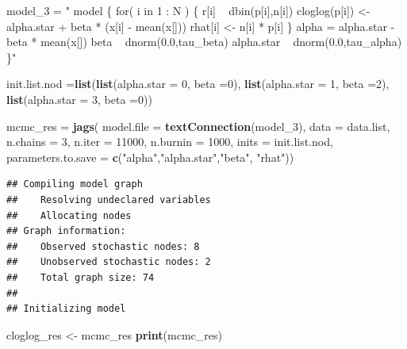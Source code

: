\documentclass[]{article}
\newenvironment{Shaded}{\begin{snugshade}}{\end{snugshade}}
\newcommand{\DataTypeTok}[1]{\textcolor[rgb]{0.13,0.29,0.53}{#1}}
\newcommand{\DecValTok}[1]{\textcolor[rgb]{0.00,0.00,0.81}{#1}}
\newcommand{\KeywordTok}[1]{\textcolor[rgb]{0.13,0.29,0.53}{\textbf{#1}}}
\newcommand{\NormalTok}[1]{#1}
\newcommand{\StringTok}[1]{\textcolor[rgb]{0.31,0.60,0.02}{#1}}
\begin{document}
\begin{Shaded}
\begin{Highlighting}[]
\NormalTok{model_}\DecValTok{3}\NormalTok{ =}\StringTok{ "}
\StringTok{      model \{}
\StringTok{       for( i in 1 : N ) \{}
\StringTok{          r[i] ~ dbin(p[i],n[i])}
\StringTok{          cloglog(p[i]) <- alpha.star + beta * (x[i] - mean(x[]))}
\StringTok{          rhat[i] <- n[i] * p[i]}
\StringTok{       \}}
\StringTok{       alpha = alpha.star - beta * mean(x[])}
\StringTok{       beta ~ dnorm(0.0,tau_beta)}
\StringTok{       alpha.star ~ dnorm(0.0,tau_alpha)   }
\StringTok{    \}"}

\NormalTok{init.list.nod =}\KeywordTok{list}\NormalTok{(}\KeywordTok{list}\NormalTok{(}\DataTypeTok{alpha.star =} \DecValTok{0}\NormalTok{, }\DataTypeTok{beta =}\DecValTok{0}\NormalTok{),}
                    \KeywordTok{list}\NormalTok{(}\DataTypeTok{alpha.star =} \DecValTok{1}\NormalTok{, }\DataTypeTok{beta =}\DecValTok{2}\NormalTok{),}
                    \KeywordTok{list}\NormalTok{(}\DataTypeTok{alpha.star =} \DecValTok{3}\NormalTok{, }\DataTypeTok{beta =}\DecValTok{0}\NormalTok{))}

\NormalTok{mcmc_res =}\StringTok{ }\KeywordTok{jags}\NormalTok{( }\DataTypeTok{model.file =} \KeywordTok{textConnection}\NormalTok{(model_}\DecValTok{3}\NormalTok{),}
                  \DataTypeTok{data =}\NormalTok{ data.list, }
                  \DataTypeTok{n.chains =} \DecValTok{3}\NormalTok{, }
                  \DataTypeTok{n.iter =} \DecValTok{11000}\NormalTok{, }
                  \DataTypeTok{n.burnin =} \DecValTok{1000}\NormalTok{,}
                  \DataTypeTok{inits =}\NormalTok{ init.list.nod, }
                  \DataTypeTok{parameters.to.save =} \KeywordTok{c}\NormalTok{(}\StringTok{"alpha"}\NormalTok{,}\StringTok{"alpha.star"}\NormalTok{,}\StringTok{"beta"}\NormalTok{, }\StringTok{"rhat"}\NormalTok{))}
\end{Highlighting}
\end{Shaded}

\begin{verbatim}
## Compiling model graph
##    Resolving undeclared variables
##    Allocating nodes
## Graph information:
##    Observed stochastic nodes: 8
##    Unobserved stochastic nodes: 2
##    Total graph size: 74
## 
## Initializing model
\end{verbatim}

\begin{Shaded}
\begin{Highlighting}[]
\NormalTok{cloglog_res <-}\StringTok{ }\NormalTok{mcmc_res}
\KeywordTok{print}\NormalTok{(mcmc_res)}
\end{Highlighting}
\end{Shaded}
\end{document}
